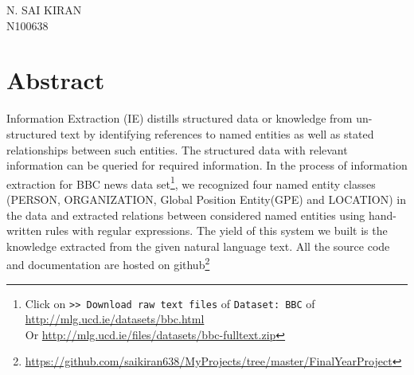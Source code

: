 \documentclass[12pt]{report}
\begin{document}
\begin{flushright}N. SAI KIRAN\\N100638\end{flushright}


\chapter*{Abstract}

\par Information Extraction (IE) distills structured data or knowledge from 
un-structured text by identifying references to named entities as well as stated relationships between such entities.
The structured data with relevant information can be queried for required information.
In the process of information extraction for BBC news data set\footnote{Click on \texttt{>> Download raw text files} of \texttt{Dataset: BBC} of \url{http://mlg.ucd.ie/datasets/bbc.html}\\Or \url{http://mlg.ucd.ie/files/datasets/bbc-fulltext.zip}},
 we recognized four named entity
 classes (PERSON, ORGANIZATION, Global Position Entity(GPE) and LOCATION) in the data
 and extracted relations between considered named entities using hand-written rules with regular expressions. 
 The yield of this system we built is the knowledge extracted from the given natural language text.
 All the source code and documentation are hosted on github\footnote{\url{https://github.com/saikiran638/MyProjects/tree/master/FinalYearProject}}
 

\end{document}
